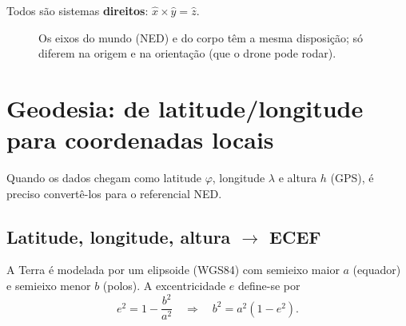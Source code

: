 \documentclass[11pt,a4paper]{article}
\theoremstyle{definition}
\begin{document}
Todos são sistemas \textbf{direitos}: $\hat{x}\times\hat{y}=\hat{z}$.

\begin{figure}[H]
\centering
{}
\caption{Os eixos do mundo (NED) e do corpo têm a mesma disposição; só diferem na origem e na orientação (que o drone pode rodar).}
\end{figure}

\section{Geodesia: de latitude/longitude para coordenadas locais}
Quando os dados chegam como latitude $\varphi$, longitude $\lambda$ e altura $h$ (GPS), é preciso convertê-los para o referencial NED.

\subsection{Latitude, longitude, altura $\rightarrow$ ECEF}

A Terra é modelada por um elipsoide (WGS84) com semieixo maior $a$ (equador) e semieixo menor $b$ (polos). A excentricidade $e$ define-se por
\begin{equation}
e^2 = 1-\frac{b^2}{a^2}\quad\Longrightarrow\quad b^2=a^2(1-e^2).
\label{eq:e2}
\end{equation}
\end{document}
